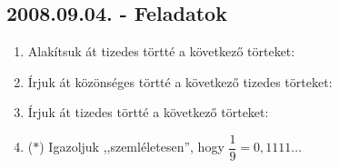 \subsection*{2008.09.04. - Feladatok}
\begin{enumerate}
\item Alakítsuk át tizedes törtté a következő törteket:


\item Írjuk át közönséges törtté a következő tizedes törteket:


\item Írjuk át tizedes törtté a következő törteket:


\item ($*$) Igazoljuk ,,szemléletesen'', hogy $\dfrac{1}{9}=0,1111\ldots$
\end{enumerate}

